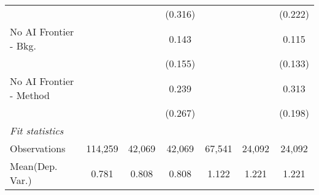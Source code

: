 \begin{tabular}{lcccccc}
                           &               &             & (0.316) &               &              & (0.222)\\   
   No AI Frontier - Bkg.   &               &             & 0.143   &               &              & 0.115\\   
                           &               &             & (0.155) &               &              & (0.133)\\   
   No AI Frontier - Method &               &             & 0.239   &               &              & 0.313\\   
                           &               &             & (0.267) &               &              & (0.198)\\   
   \midrule
   \emph{Fit statistics}\\
   Observations            & 114,259       & 42,069      & 42,069  & 67,541        & 24,092       & 24,092\\  
Mean(Dep. Var.) & 0.781 & 0.808 & 0.808 & 1.122 & 1.221 & 1.221 \\
   

\end{tabular}

